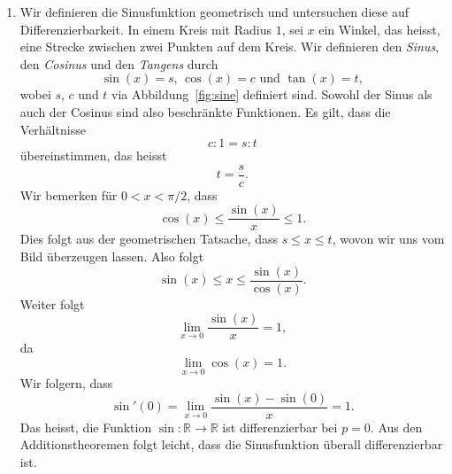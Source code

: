 \documentclass[../main.tex]{subfiles}
\begin{document}
\begin{examples}
\begin{enumerate}[(1)]
    \item Wir definieren die Sinusfunktion geometrisch 
      und untersuchen diese auf Differenzierbarkeit.
      In einem Kreis mit Radius $1$, sei $x$ ein Winkel,
      das heisst, eine Strecke zwischen zwei Punkten auf
      dem Kreis.
      Wir definieren den \emph{Sinus},
      den \emph{Cosinus} und den \emph{Tangens} durch
      \[
        \sin(x) = s \text{, } \cos(x) = c \text{ und }
        \tan(x) = t,
      \]
      wobei $s$, $c$ und $t$ via Abbildung~\ref{fig:sine}
      definiert sind.
      Sowohl der Sinus als auch der Cosinus
      sind also beschränkte Funktionen.
      Es gilt, dass die Verhältnisse
      \[
        c : 1 = s : t
      \]
      übereinstimmen, das heisst
      \[
        t = \frac{s}{c}.
      \]
      Wir bemerken für
      $0 < x < \pi/2$, dass
      \[
        \cos(x) \leq \frac{\sin(x)}{x} \leq 1.
      \]
      Dies folgt aus der geometrischen Tatsache,
      dass $s \leq x \leq t$,
      wovon wir uns vom Bild überzeugen lassen. %
      Also folgt
      \[
        \sin(x) \leq x \leq \frac{\sin(x)}{\cos(x)}.
      \]
      Weiter folgt
      \[
        \lim_{x \to 0} \frac{\sin(x)}{x} = 1,
      \]
      da 
      \[
        \lim_{x \to 0} \cos(x) = 1.
      \]
      Wir folgern, dass
      \[
        \sin'(0) = 
        \lim_{x \to 0} \frac{\sin(x) - \sin(0)}{x}
        = 1.
      \]
      Das heisst, die Funktion 
      $\sin \colon \mathbb{R} \to \mathbb{R}$ ist differenzierbar
      bei $p = 0$.
      Aus den Additionstheoremen folgt leicht,
      dass die Sinusfunktion überall differenzierbar ist.


\end{enumerate}
\end{examples}
\end{document}
